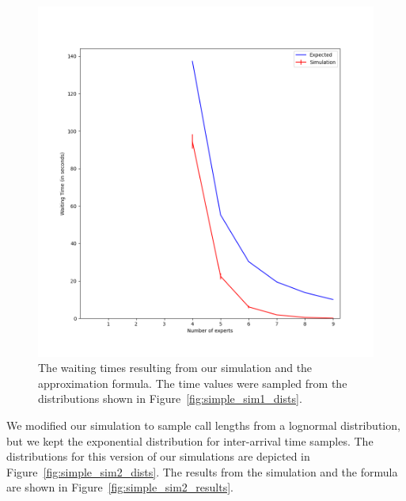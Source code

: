 \begin{figure}[h]
  \includegraphics[width=\textwidth]{figures/montecarlo/independent_calls_expon.png}
  \caption{
    The waiting times resulting from our simulation and the approximation
    formula.
    The time values were sampled from the distributions shown in
    Figure~\ref{fig:simple_sim1_dists}.
  }\label{fig:simple_sim1_results}
\end{figure}

We modified our simulation to sample call lengths from a lognormal distribution,
but we kept the exponential distribution for inter-arrival time samples.
The distributions for this version of our simulations are depicted in
Figure~\ref{fig:simple_sim2_dists}.
The results from the simulation and the formula are shown in
Figure~\ref{fig:simple_sim2_results}.


